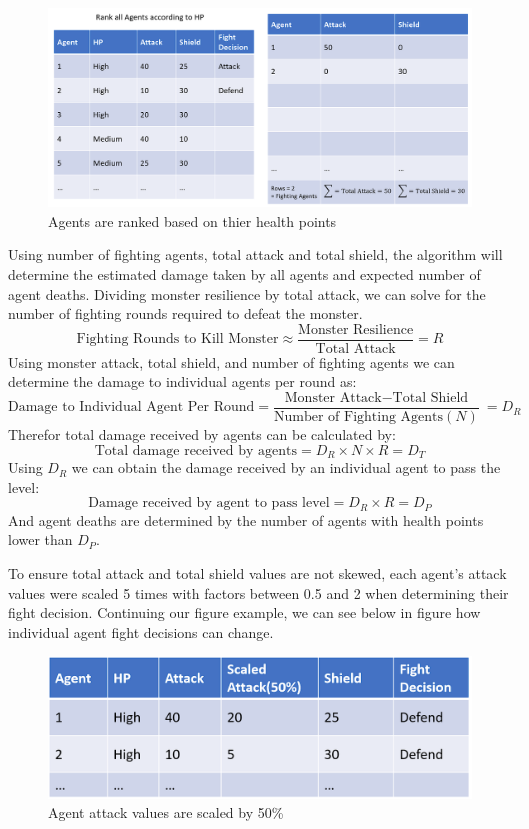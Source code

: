 \begin{figure}[htb]
    \centering
    \includegraphics[width=1\textwidth]{008_team_5_agent_design/images/Rank-all-Agents-by-hp.png}
    \caption{Agents are ranked based on thier health points}
    \label{rankagents}
\end{figure}


Using number of fighting agents, total attack and total shield, the algorithm will determine the estimated damage taken by all agents and expected number of agent deaths. Dividing monster resilience by total attack, we can solve for the number of fighting rounds required to defeat the monster.
\[\text{Fighting Rounds to Kill Monster} \approx \frac{\text{Monster Resilience}}{\text{Total Attack}}=R\]
Using monster attack, total shield, and number of fighting agents we can determine the damage to individual agents per round as:
\[\text{Damage to Individual Agent Per Round} = \frac{\text{Monster Attack}\mathrm{-}\text{Total Shield}}{\text{Number of Fighting Agents} (N)}\ =D_R\]
Therefor total damage received by agents can be calculated by:
\[\text{Total damage received by agents} = D_R \times N \times R = D_T\]
Using $D_R$ we can obtain the damage received by an individual agent to pass the level:
\[\text{Damage received by agent to pass level} = D_R \times  R = D_P\]
And agent deaths are determined by the number of agents with health points lower than $D_P$.

To ensure total attack and total shield values are not skewed, each agent's attack values were scaled 5 times with factors between 0.5 and 2 when determining their fight decision. Continuing our figure example, we can see below in figure how individual agent fight decisions can change.
\begin{figure}[htb]
    \centering
    \includegraphics[width=1\textwidth]{008_team_5_agent_design/images/scaled-attack.PNG}
    \caption{Agent attack values are scaled by 50\%}
    \label{scaledattack}
\end{figure}

